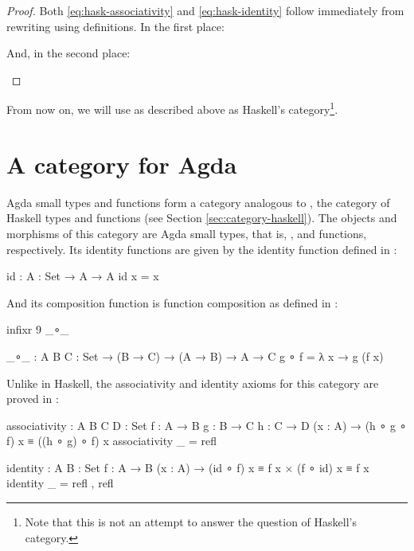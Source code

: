 \begin{proof}

  Both \eqref{eq:hask-associativity} and \eqref{eq:hask-identity}
  follow immediately from rewriting using definitions. In the first
  place:
  \begin{steps}
  \end{steps}
  And, in the second place:
  \begin{steps}
  \end{steps}

\end{proof}

From now on, we will use \hask as described above as Haskell's
category\footnote{Note that this is not an attempt to answer the
  question of Haskell's category.}.

\section{A category for Agda}
\label{sec:category-agda}

Agda small types and functions form a category analogous to \hask, the
category of Haskell types and functions (see Section
\ref{sec:category-haskell}). The objects and morphisms of this
category are Agda small types, that is, , and functions,
respectively. Its identity functions are given by the identity
function defined in :
\begin{codeagda}
id : {A : Set} → A → A
id x = x
\end{codeagda}
And its composition function is function composition as defined in
:
\begin{codeagda}
infixr 9 _∘_

_∘_ : {A B C : Set} → (B → C) → (A → B) → A → C
g ∘ f = λ x → g (f x)
\end{codeagda}
Unlike in Haskell, the associativity and identity axioms for this
category are proved in :
\begin{codeagda}
associativity : {A B C D : Set} {f : A → B} {g : B → C} {h : C → D}
                (x : A) → (h ∘ g ∘ f) x ≡ ((h ∘ g) ∘ f) x
associativity _ = refl

identity : {A B : Set} {f : A → B}
           (x : A) → (id ∘ f) x ≡ f x × (f ∘ id) x ≡ f x
identity _ = refl , refl
\end{codeagda}

